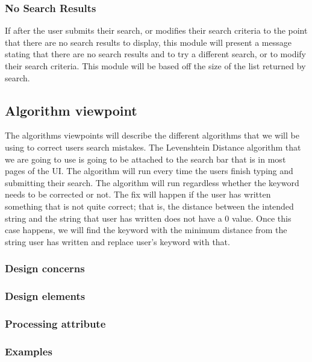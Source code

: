 \documentclass[journal,compsoc, 10pt, draftclsnofoot, onecolumn]{IEEEtran}
\begin{document}
\subsubsection*{No Search Results}
If after the user submits their search, or modifies their search criteria to the
 point that there are no search results to display, this module will present a 
message stating that there are no search results and to try a different search, 
or to modify their search criteria. This module will be based off the size of 
the list returned by search.


\subsection{Algorithm viewpoint}
The algorithms viewpoints will describe the different algorithms that we will be
 using to correct users search mistakes. The Levenshtein Distance algorithm that 
we are going to use is going to be attached to the search bar that is in most 
pages of the UI. The algorithm will run every time the users finish typing and 
submitting their search. The algorithm will run regardless whether the keyword 
needs to be corrected or not. The fix will happen if the user has written 
something that is not quite correct; that is, the distance between the intended 
string and the string that user has written does not have a 0 value. Once this 
case happens, we will find the keyword with the minimum distance from the string 
user has written and replace user's keyword with that.

\subsubsection*{Design concerns}

\subsubsection*{Design elements}

\subsubsection*{Processing attribute}

\subsubsection*{Examples}
\end{document}
